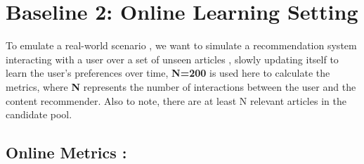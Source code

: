 \documentclass[a4paper,fontsize=8.0pt]{scrartcl}
\begin{document}
\vspace{-1ex}
\section{Baseline 2: Online Learning Setting}
\begin{flushleft}
To emulate a real-world scenario , we want to simulate a recommendation system interacting with a user over a set of unseen articles , slowly updating itself to learn the user's preferences over time, \textbf{N=200} is used here to calculate the metrics, where \textbf{N }represents the number of interactions between the user and the content recommender. Also to note, there are at least N relevant articles in the candidate pool. 
\end{flushleft}
\subsection{Online Metrics :}
\end{document}
